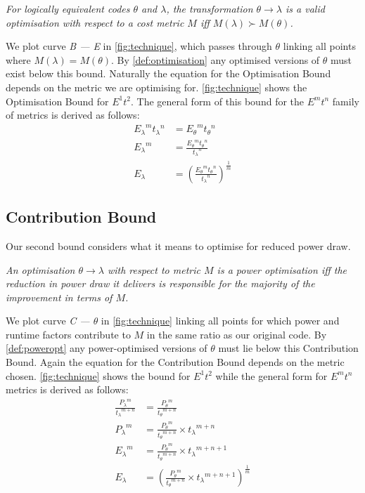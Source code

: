 \begin{definition}
\textit{For logically equivalent codes $\theta$ and $\lambda$, the transformation ${\theta \to \lambda}$ is a valid optimisation with respect to a cost metric $M$ iff ${M(\lambda) \succ M(\theta)}$.}
\label{def:optimisation}
\end{definition}

\noindent
We plot curve \emph{B --- E} in \autoref{fig:technique}, which passes through $\theta$ linking all points where ${M(\lambda) = M(\theta)}$. 
By \autoref{def:optimisation} any optimised versions of $\theta$ must exist below this bound.
Naturally the equation for the Optimisation Bound depends on the metric we are optimising for.
\autoref{fig:technique} shows the Optimisation Bound for $E^1t^2$.
The general form of this bound for the $E^mt^n$ family of metrics is derived as follows:
\begin{align}
 {E_\lambda}^m{t_\lambda}^n &= {E_\theta}^m{t_\theta}^n \nonumber \\
 {E_\lambda}^m &= \frac{{E_\theta}^m{t_\theta}^n}{{t_\lambda}^n} \nonumber \\
  E_\lambda &= (\frac{{E_\theta}^m{t_\theta}^n}{{t_\lambda}^n})^\frac{1}{m}
\label{eq:optimisation}
\end{align}

\subsection{Contribution Bound}
\noindent
Our second bound considers what it means to optimise for reduced power draw.
\begin{definition}
\textit{An optimisation $\theta \to \lambda$ with respect to metric $M$ is a power optimisation iff the reduction in power draw it delivers is responsible for the majority of the improvement in terms of $M$.}
\label{def:poweropt}
\end{definition}

\noindent
We plot curve \emph{C --- $\theta$} in \autoref{fig:technique} linking all points for which power and runtime factors contribute to $M$ in the same ratio as our original code.
By \autoref{def:poweropt} any power-optimised versions of $\theta$ must lie below this Contribution Bound.
Again the equation for the Contribution Bound depends on the metric chosen. 
\autoref{fig:technique} shows the bound for $E^1t^2$ while the general form for $E^mt^n$ metrics is derived as follows:
\begin{align}
\frac{{P_{\lambda}}^m}{{t_{\lambda}}^{m+n}} &= \frac{{P_{\theta}}^m}{{t_{\theta}}^{m+n}} \nonumber \\
 {P_{\lambda}}^m &= \frac{{P_{\theta}}^m}{{t_{\theta}}^{m+n}} \times {t_\lambda}^{m+n} \nonumber \\ 
 {E_{\lambda}}^m &= \frac{{P_{\theta}}^m}{{t_{\theta}}^{m+n}} \times {t_\lambda}^{m+n+1} \nonumber \\ 
  E_{\lambda} &= (\frac{{P_{\theta}}^m}{{t_{\theta}}^{m+n}} \times {t_\lambda}^{m+n+1})^{\frac{1}{m}} 
  \label{eq:contribution}
\end{align}

